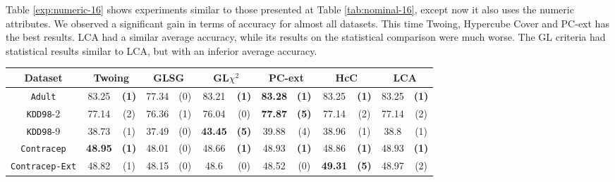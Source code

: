 Table \ref{exp:numeric-16} shows experiments  similar to those presented at Table \ref{tab:nominal-16}, except now it also uses the numeric attributes. We observed a significant gain in terms of accuracy for almost all datasets. This time Twoing, Hypercube Cover and PC-ext has the best results. LCA had a similar average accuracy, while its results on the statistical comparison were much worse. The GL criteria had statistical results similar to LCA, but with an inferior average accuracy.

\begin{table}
\scriptsize
\centering
\begin{tabular}{c|cc|cc|cc|cc|cc|cc} 
Dataset              &        \multicolumn{2}{c|}{Twoing} &   \multicolumn{2}{c|}{GLSG} &   \multicolumn{2}{c|}{GL$\chi^2$} & \multicolumn{2}{c|}{PC-ext}  & \multicolumn{2}{c|}{HcC}  & \multicolumn{2}{c}{LCA}  \\
\hline   
{\tt Adult}          &  83.25         &  {\bf (1)}        &  77.34      &  (0)          &  83.21       &  {\bf (1)}         & {\bf 83.28} & {\bf (1)}      & 83.25        & {\bf (1)} & 83.25        & {\bf (1)} \\
{\tt KDD98}-2        &  77.14         &  (2)              &  76.36      &  (1)          &  76.04       &  (0)               & {\bf 77.87} & {\bf (5)}      & 77.14        & (2)       & 77.14        & (2)       \\
{\tt KDD98}-9        &  38.73         &  (1)              &  37.49      &  (0)          &  {\bf 43.45} &  {\bf (5)}         &  39.88      & (4)            & 38.96        & (1)       & 38.8         & (1)       \\
{\tt Contracep}      &  {\bf 48.95}   &  {\bf (1)}        &  48.01      &  (0)          &  48.66       &  {\bf (1)}         &  48.93      & {\bf (1)}      & 48.86        & {\bf (1)} & 48.93        & {\bf (1)} \\
{\tt Contracep-Ext}  &  48.82         &  (1)              &  48.15      &  (0)          &  48.6        &  (0)               &  48.52      & (0)            & {\bf 49.31 } & {\bf (5)} & 48.97        & (2)       \\

\end{tabular}
\end{table}
